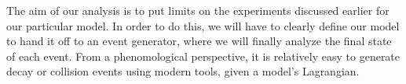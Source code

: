 \label{chapter:analysis}

The aim of our analysis is to put limits on the experiments discussed earlier for our particular model.
In order to do this, we will have to clearly define our model to hand it off to an event generator, where we will finally analyze the final state of each event.
From a phenomological perspective, it is relatively easy to generate decay or collision events using modern tools, given a model's Lagrangian. 



